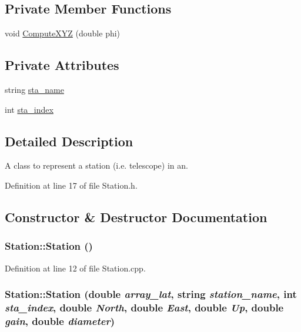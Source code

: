 \subsection*{Private Member Functions}
\begin{DoxyCompactItemize}
\item 
void \hyperlink{classStation_a9ac5daebf0b5e54276a6afed7b5a61c0}{ComputeXYZ} (double phi)
\end{DoxyCompactItemize}
\subsection*{Private Attributes}
\begin{DoxyCompactItemize}
\item 
string \hyperlink{classStation_ad06effdce23c36b4281297e636f852c2}{sta\_\-name}
\item 
int \hyperlink{classStation_a1d576c7627ce27b72d78cbfe26c29d60}{sta\_\-index}
\end{DoxyCompactItemize}


\subsection{Detailed Description}
A class to represent a station (i.e. telescope) in an. 

Definition at line 17 of file Station.h.



\subsection{Constructor \& Destructor Documentation}
\hypertarget{classStation_a73d335726aad1d844d81cda6d9fd74e6}{
\subsubsection[{Station}]{\setlength{\rightskip}{0pt plus 5cm}Station::Station ()}}
\label{classStation_a73d335726aad1d844d81cda6d9fd74e6}


Definition at line 12 of file Station.cpp.

\hypertarget{classStation_a47edc3b9cf60324e4b1146c94a2cbaf5}{
\subsubsection[{Station}]{\setlength{\rightskip}{0pt plus 5cm}Station::Station (double {\em array\_\-lat}, \/  string {\em station\_\-name}, \/  int {\em sta\_\-index}, \/  double {\em North}, \/  double {\em East}, \/  double {\em Up}, \/  double {\em gain}, \/  double {\em diameter})}}
\label{classStation_a47edc3b9cf60324e4b1146c94a2cbaf5}


